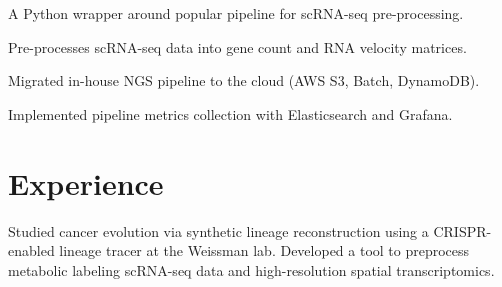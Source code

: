 \documentclass[]{resume}
\begin{document}
\begin{minipage}[t]{0.69\textwidth}
\begin{tightemize}
\item A Python wrapper around popular pipeline for scRNA-seq pre-processing.
\item Pre-processes scRNA-seq data into gene count and RNA velocity matrices.
\end{tightemize}
\sectionsep

\begin{tightemize}
\item Migrated in-house NGS pipeline to the cloud (AWS S3, Batch, DynamoDB).
\item Implemented pipeline metrics collection with Elasticsearch and Grafana.
\end{tightemize}
\sectionsep


\section{Experience}
Studied cancer evolution via synthetic lineage reconstruction using a CRISPR-enabled lineage tracer \cite{kp} at the Weissman lab. Developed a tool to preprocess metabolic labeling scRNA-seq data \cite{dynamo} and high-resolution spatial transcriptomics.
\sectionsep


\end{minipage}
\end{document}
